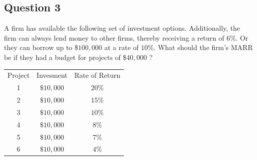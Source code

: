 \documentclass[12pt]{article}
\begin{document}
\subsection*{Question 3}
\begin{q}
A firm has available the following set of investment options. Additionally, the firm can always lend money to other firms, thereby receiving a return of \(6 \%\). Or they can borrow up to \(\$ 100,000\) at a rate of \(10 \%\). What should the firm's MARR be if they had a budget for projects of \(\$ 40,000\) ?

\begin{center}
\begin{tabular}{ccc} 
Project & Invesment & Rate of Return \\
1 & \(\$ 10,000\) & \(20 \%\) \\
2 & \(\$ 10,000\) & \(15 \%\) \\
3 & \(\$ 10,000\) & \(10 \%\) \\
4 & \(\$ 10,000\) & \(8 \%\) \\
5 & \(\$ 10,000\) & \(7 \%\) \\
6 & \(\$ 10,000\) & \(4 \%\)
\end{tabular}
\end{center}
\end{q}
\end{document}
